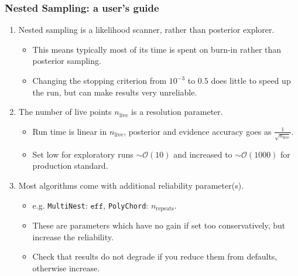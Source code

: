 \documentclass[aspectratio=169]{beamer}
\begin{document}
\begin{frame}
    \frametitle{Nested Sampling: a user's guide}
    \begin{enumerate}
        \item Nested sampling is a likelihood scanner, rather than posterior explorer.
            \begin{itemize}
                \item This means typically most of its time is spent on burn-in rather than posterior sampling.
                \item Changing the stopping criterion from $10^{-3}$ to $0.5$ does little to speed up the run, but can make results very unreliable.
            \end{itemize}
        \item The number of live points $n_\text{live}$ is a resolution parameter.
            \begin{itemize}
                \item Run time is linear in $n_\text{live}$, posterior and evidence accuracy goes as $\frac{1}{\sqrt{n_\text{live}}}$.
                \item Set low for exploratory runs $\sim\mathcal{O}(10)$ and increased to $\sim\mathcal{O}(1000)$ for production standard.
            \end{itemize}
        \item Most algorithms come with additional reliability parameter(s).
            \begin{itemize}
                \item e.g. \texttt{MultiNest}: $\texttt{eff}$, \texttt{PolyChord}: $n_\text{repeats}$.
                \item These are parameters which have no gain if set too conservatively, but increase the reliability.
                \item Check that results do not degrade if you reduce them from defaults, otherwise increase.
            \end{itemize}
    \end{enumerate}
\end{frame}
\end{document}
